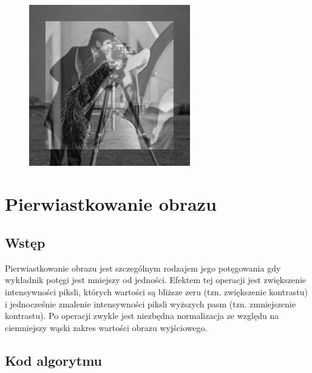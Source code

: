 \documentclass[a4paper,12pt]{book}
\begin{document}
\begin{figure}[H]
	\includegraphics[width=7cm, height=7cm]{2-5/divide-gray-images-photoman-lena-norm.png}
\end{figure}

\section{Pierwiastkowanie obrazu}
\subsection*{Wstęp}
Pierwiastkowanie obrazu jest szczególnym rodzajem jego potęgowania gdy wykładnik potęgi jest mniejszy od jedności. Efektem tej operacji jest zwiększenie intensywności piksli, których wartości są bliższe zeru (tzn. zwiększenie kontrastu) i jednocześnie zmalenie intensywności piksli wyższych pasm (tzn. zmniejszenie kontrastu). Po operacji zwykle jest niezbędna normalizacja ze względu na ciemniejszy wąski zakres wartości obrazu wyjściowego. 

\subsection*{Kod algorytmu}
\end{document}
